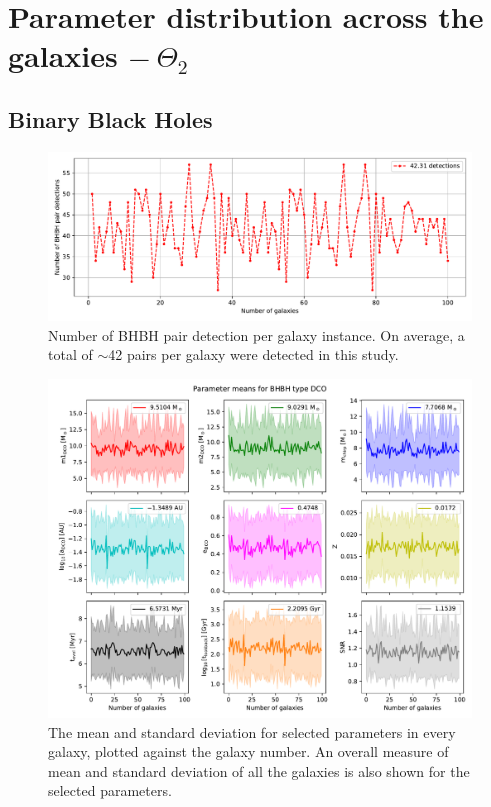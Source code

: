 \section{Parameter distribution across the galaxies $-\ \Theta_2$}
\label{sec:paramter-distribution-across-the-galaxies-theta-2}

\subsection{Binary Black Holes}
\begin{figure}[!h]
    \centering
    \includegraphics[width=\columnwidth]{analysis_data/004__images_for_latex/BHBH0e_n_detections}
    \caption{Number of BHBH pair detection per galaxy instance. On average, a total of $\sim$42 pairs per galaxy were detected in this study.}
    \label{fig:bhbh0endetections}
\end{figure}

\begin{figure}[!h]
    \centering
    \includegraphics[width=\columnwidth]{analysis_data/004__images_for_latex/BHBH0e_n_galaxy_mean_plot}
    \caption{The mean and standard deviation for selected parameters in every galaxy, plotted against the galaxy number. An overall measure of mean and standard deviation of all the galaxies is also shown for the selected parameters.}
    \label{fig:bhbh0e_n_galaxy_mean_plot}
\end{figure}

